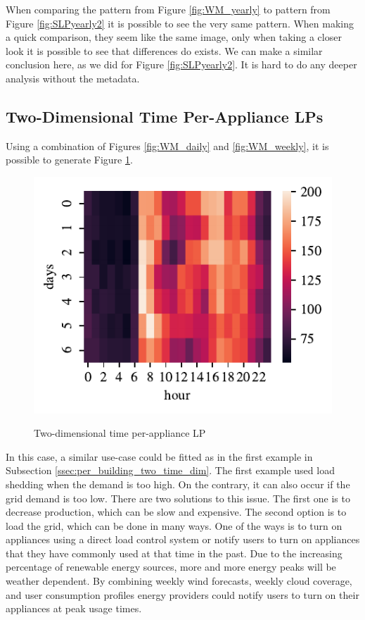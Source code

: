 When comparing the pattern from Figure \ref{fig:WM_yearly} to pattern from Figure \ref{fig:SLPyearly2} 
it is possible to see the very same pattern. When making a quick comparison, they seem like the same image,
only when taking a closer look it is possible to see that differences do exists. 
We can make a similar conclusion here, as we did for Figure \ref{fig:SLPyearly2}.
It is hard to do any deeper analysis without the metadata.

\subsection{Two-Dimensional Time Per-Appliance LPs}

Using a combination of Figures \ref{fig:WM_daily} and \ref{fig:WM_weekly},
it is possible to generate Figure \ref{fig:wm_hm_weekly}.

\begin{figure}[H]
	\centering
	\caption{Two-dimensional time per-appliance LP}
	\includegraphics[]{../Figures/LPS/wm_hm_weekly.pdf}
	\label{fig:wm_hm_weekly}
\end{figure}
 
In this case, a similar use-case could be fitted as in the first example in Subsection \ref{ssec:per_building_two_time_dim}.
The first example used load shedding when the demand is too high.
On the contrary, it can also occur if the grid demand is too low.
There are two solutions to this issue.
The first one is to decrease production, which can be slow and expensive.
The second option is to load the grid, which can be done in many ways.
One of the ways is to turn on appliances using a direct load control system or notify users to turn on appliances that they have commonly used at that time in the past. 
Due to the increasing percentage of renewable energy sources, more and more energy peaks will be weather dependent.
By combining weekly wind forecasts, weekly cloud coverage, and user consumption profiles energy providers could notify users to turn on their appliances at peak usage times.

